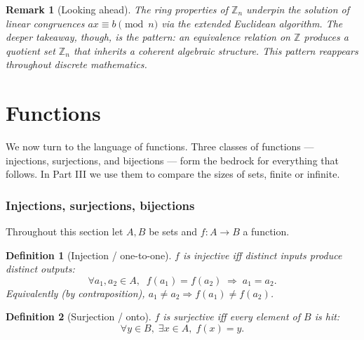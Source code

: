 \documentclass[11pt]{article}
\theoremstyle{defstyle}
\newtheorem{definition}{Definition}[section]
\theoremstyle{thmstyle}
\theoremstyle{notstyle}
\newtheorem*{remark}{Remark}
\theoremstyle{cautionstyle}
\newcommand{\Z}{\mathbb{Z}}
\newcommand{\Zn}{\mathbb{Z}_n}
\newcommand{\modn}{\pmod{n}}
\begin{document}
\begin{notebox}
\begin{remark}[Looking ahead]
The ring properties of $\Zn$ underpin the solution of linear congruences
$ax \equiv b \modn$ via the extended Euclidean algorithm.  The deeper
takeaway, though, is the pattern: an equivalence relation on $\Z$
produces a quotient set $\Zn$ that inherits a coherent algebraic
structure.  This pattern reappears throughout discrete mathematics.
\end{remark}
\end{notebox}

\newpage

\part{Functions}

We now turn to the language of functions.  Three classes of functions
--- injections, surjections, and bijections --- form the bedrock for
everything that follows.  In Part III we use them to compare the sizes
of sets, finite or infinite.

\section{Injections, surjections, bijections}

Throughout this section let $A, B$ be sets and $f \colon A \to B$ a function.

\begin{defbox}
\begin{definition}[Injection / one-to-one]
$f$ is \emph{injective} iff distinct inputs produce distinct outputs:
\[
  \forall a_1, a_2 \in A,\;\; f(a_1) = f(a_2) \;\Rightarrow\; a_1 = a_2.
\]
Equivalently (by contraposition), $a_1 \neq a_2 \Rightarrow f(a_1) \neq f(a_2)$.
\end{definition}
\end{defbox}

\begin{defbox}
\begin{definition}[Surjection / onto]
$f$ is \emph{surjective} iff every element of $B$ is hit:
\[
  \forall y \in B,\; \exists x \in A,\; f(x) = y.
\]
\end{definition}
\end{defbox}
\end{document}
